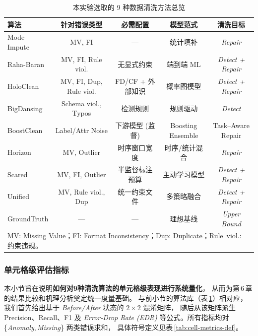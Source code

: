 \documentclass[10pt]{article} %
\numberwithin{equation}{section}
\begin{document}
\begin{table}[t]
\centering
\small
\renewcommand{\arraystretch}{1.15}
\setlength{\tabcolsep}{4pt}
\begin{tabular}{@{}lcccc@{}}
\toprule
\textbf{算法} & \textbf{针对错误类型} & \textbf{必需配置} &
\textbf{模型范式} & \textbf{清洗目标} \\
\midrule
Mode Impute & MV, FI & — &
统计填补 & \textit{Repair} \\

Raha-Baran & MV, FI, Rule viol. & 无显式约束 &
端到端 ML & \textit{Detect + Repair} \\

HoloClean & MV, FI, Dup, Rule viol. &
FD/CF + 外部知识 &
概率图模型 & \textit{Detect + Repair} \\

BigDansing & Schema viol., Typos &
检测规则 & 规则驱动 & \textit{Detect} \\

BoostClean & Label/Attr Noise &
下游模型 (监督) &
Boosting Ensemble & Task–Aware Repair \\

Horizon & MV, Outlier &
时序窗口宽度 &
时序/统计混合 & \textit{Repair} \\

Scared & MV, FI, Outlier &
半监督标注预算 &
主动学习模型 & \textit{Detect + Repair} \\

Unified & MV, Rule viol., Dup &
统一约束文件 &
多策略融合 & \textit{Detect + Repair} \\

GroundTruth & — & — &
理想基线 & \textit{Upper Bound} \\
\bottomrule
\multicolumn{5}{l}{\footnotesize
MV: Missing Value；FI: Format Inconsistency；Dup: Duplicate；Rule~viol.: 约束违规。}
\end{tabular}
\caption{本实验选取的 9 种数据清洗方法总览}
\label{tab:clean_algo_overview}
\end{table}

\vspace{-1em}
\subsubsection{单元格级评估指标}\label{sec:metrics}
\textcolor[rgb]{0.00,0.07,1.00}{本小节旨在说明\textbf{如何对9种清洗算法的单元格级表现进行系统量化}，
从而为第 6 章的结果比较和机理分析奠定统一度量基础。
与前小节的算法库（表 \ref{tab:clean_algo_overview}）相对应，
我们首先给出基于 \emph{Before/After} 状态的 $2\times2$ 混淆矩阵，
随后从该矩阵派生 Precision、Recall、F1 及
\emph{Error‑Drop Rate (EDR)} 等公式。所有指标均对
\{\textit{Anomaly},\,\textit{Missing}\} 两类错误求和，
具体符号定义见表 \ref{tab:cell-metrics-def}。}
\end{document}
